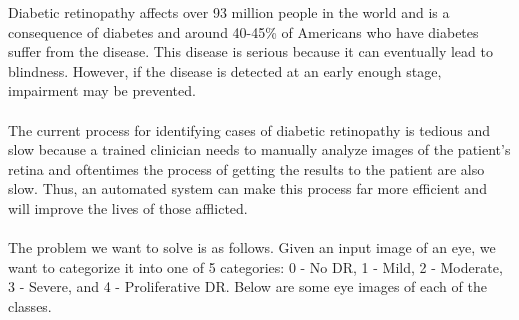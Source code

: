 \documentclass{article} %
\begin{document}
Diabetic retinopathy affects over 93 million people in the world and is a consequence of diabetes and around 40-45\% of Americans who have diabetes suffer from the disease. This disease is serious because it can eventually lead to blindness. However, if the disease is detected at an early enough stage, impairment may be prevented. \\ \\
The current process for identifying cases of diabetic retinopathy is tedious and slow because a trained clinician needs to manually analyze images of the patient’s retina and oftentimes the process of getting the results to the patient are also slow. Thus, an automated system can make this process far more efficient and will improve the lives of those afflicted. \\ \\
The problem we want to solve is as follows. Given an input image of an eye, we want to categorize it into one of 5 categories: 0 - No DR, 1 - Mild, 2 - Moderate, 3 - Severe, and 4 - Proliferative DR. Below are some eye images of each of the classes.
\begin{figure}[H]
	\centering
\end{figure}  
\end{document}
